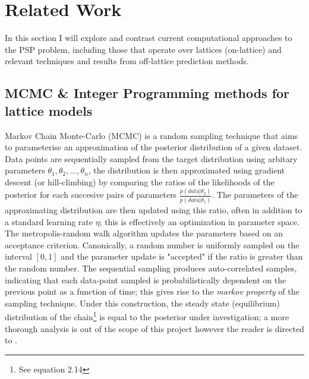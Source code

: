 \section{Related Work}
In this section I will explore and contrast current computational approaches to the PSP problem,
including those that operate over lattices (on-lattice) and relevant techniques and results from
off-lattice prediction methods.
\subsection{MCMC \& Integer Programming methods for lattice models}
Markov Chain Monte-Carlo (MCMC) is a random sampling technique that aims to parameterise
an approximation of the posterior distribution of a given dataset. Data points are sequentially sampled from the target distribution
using arbitary parameters $\theta_1 , \theta_2, \hdots, \theta_n$, the distribution is then approximated
using gradient descent (or hill-climbing) by comparing the ratios of the likelihoods of the posterior 
for each succesive pairs of parameters $\frac{p(data | \theta_2)}{p(data | \theta_1)}$. The parameters of the approximating
distribution are then updated using this ratio, often in addition to a standard learning 
rate $\eta$; this is effectively an optimization in parameter space. The metropolis-random walk algorithm
updates the parameters based on an acceptance criterion. Canonically, a random number is uniformly sampled
on the interval $[0,1]$ and the parameter update is "accepted" if the ratio is greater than the random number.
The sequential sampling produces auto-correlated samples, indicating that each data-point sampled is
probabilistically dependent on the previous point as a function of time; this gives rise to the \emph{markov property}
of the sampling technique. Under this construction, the steady state (equilibrium) distribution of the chain\footnote{See equation 2.14}
is equal to the posterior under investigation; a more thorough analysis is out of the scope of this project however
the reader is directed to \cite{levin2017markov}. \\

